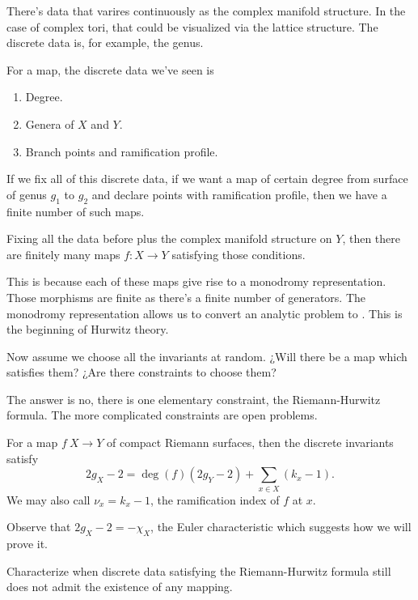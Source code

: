 \documentclass[12pt]{memoir}
\begin{document}
 There's data that varires continuously as the complex manifold structure. In the case of complex tori, that could be visualized via the lattice structure. The discrete data is, for example, the genus.\par
 For a map, the discrete data we've seen is 
 \begin{enumerate}
    \item Degree.
    \item Genera of $X$ and $Y$.
    \item Branch points and ramification profile.
 \end{enumerate}

 If we fix all of this discrete data, if we want a map of certain degree from surface of genus $g_1$ to $g_2$ and declare points with ramification profile, then we have a finite number of such maps.

 \begin{Rmk}
    Fixing all the data before plus the complex manifold structure on $Y$, then there are finitely many maps $f:X\to Y$ satisfying those conditions.
 \end{Rmk}

 This is because each of these maps give rise to a monodromy representation. Those morphisms are finite as there's a finite number of generators. The monodromy representation allows us to convert an analytic problem to . This is the beginning of Hurwitz theory.

 \begin{significant}
    Now assume we choose all the invariants at random. ¿Will there be a map which satisfies them? ¿Are there constraints to choose them?
 \end{significant}

 The answer is no, there is one elementary constraint, the Riemann-Hurwitz formula. The more complicated constraints are open problems.

 \begin{Th}
    For a map $f\: X\to Y$ of compact Riemann surfaces, then the discrete invariants satisfy 
    $$2g_X-2=\deg(f)(2g_Y-2)+\sum_{x\in X}(k_x-1).$$
    We may also call $\nu_x=k_x-1$, the ramification index of $f$ at $x$.
 \end{Th}

 Observe that $2g_X-2=-\chi_X$, the Euler characteristic which suggests how we will prove it.

 \begin{Qn}[Open]
    Characterize when discrete data satisfying the Riemann-Hurwitz formula still does not admit the existence of any mapping. 
 \end{Qn}
\end{document}

